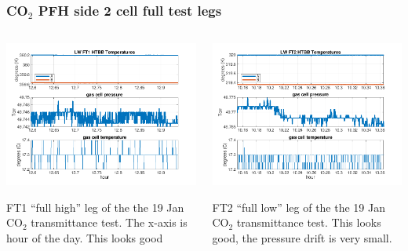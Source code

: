 \documentclass[10pt]{beamer}
\begin{document}
\begin{frame}
\frametitle{CO$_2$ PFH side 2 cell full test legs}
\begin{columns}[t]
\begin{column}{0.5\textwidth}
  \begin{centering}
  \includegraphics[width=\textwidth]{harvest_01-19/01-19_LW_FT1.png}
  \end{centering}\vspace{3mm}

  FT1 ``full high'' leg of the the 19 Jan CO$_2$ transmittance test.
  The x-axis is hour of the day.  This looks good

\end{column}
\begin{column}{0.5\textwidth}  
  \begin{centering}
  \includegraphics[width=\textwidth]{harvest_01-19/01-19_LW_FT2.png}
  \end{centering}\vspace{3mm}

  FT2 ``full low'' leg of the the 19 Jan CO$_2$ transmittance test.
  This looks good, the pressure drift is very small.

\end{column}
\end{columns}
\end{frame}
\end{document}
